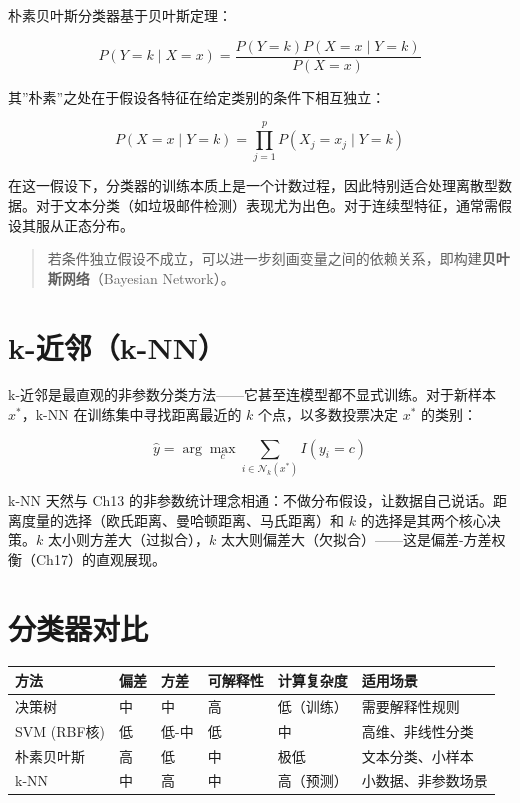 \documentclass[
]{book}
\begin{document}
朴素贝叶斯分类器基于贝叶斯定理：

\[
P(Y = k \mid X = x) = \frac{P(Y = k) P(X = x \mid Y = k)}{P(X = x)}
\]

其''朴素''之处在于假设各特征在给定类别的条件下相互独立：

\[
P(X = x \mid Y = k) = \prod_{j=1}^{p} P(X_j = x_j \mid Y = k)
\]

在这一假设下，分类器的训练本质上是一个计数过程，因此特别适合处理离散型数据。对于文本分类（如垃圾邮件检测）表现尤为出色。对于连续型特征，通常需假设其服从正态分布。

\begin{quote}
若条件独立假设不成立，可以进一步刻画变量之间的依赖关系，即构建\textbf{贝叶斯网络}（Bayesian Network）。
\end{quote}

\section{k-近邻（k-NN）}\label{k-ux8fd1ux90bbk-nn}

k-近邻是最直观的非参数分类方法------它甚至连模型都不显式训练。对于新样本 \(x^*\)，k-NN 在训练集中寻找距离最近的 \(k\) 个点，以多数投票决定 \(x^*\) 的类别：

\[\hat{y} = \arg\max_{c} \sum_{i \in \mathcal{N}_k(x^*)} I(y_i = c)\]

k-NN 天然与 Ch13 的非参数统计理念相通：不做分布假设，让数据自己说话。距离度量的选择（欧氏距离、曼哈顿距离、马氏距离）和 \(k\) 的选择是其两个核心决策。\(k\) 太小则方差大（过拟合），\(k\) 太大则偏差大（欠拟合）------这是偏差-方差权衡（Ch17）的直观展现。

\section{分类器对比}\label{ux5206ux7c7bux5668ux5bf9ux6bd4}

\begin{longtable}[]{@{}llllll@{}}
\toprule\noalign{}
方法 & 偏差 & 方差 & 可解释性 & 计算复杂度 & 适用场景 \\
\midrule\noalign{}
\endhead
\bottomrule\noalign{}
\endlastfoot
决策树 & 中 & 中 & 高 & 低（训练） & 需要解释性规则 \\
SVM (RBF核) & 低 & 低-中 & 低 & 中 & 高维、非线性分类 \\
朴素贝叶斯 & 高 & 低 & 中 & 极低 & 文本分类、小样本 \\
k-NN & 中 & 高 & 中 & 高（预测） & 小数据、非参数场景 \\
\end{longtable}
\end{document}
